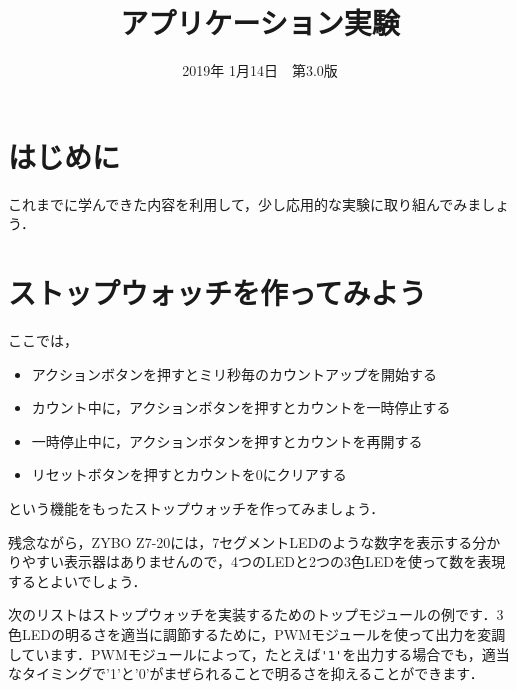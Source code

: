 \documentclass[a4paper,dvipdfmx]{jsarticle}
\begin{document}
\title{アプリケーション実験}
\author{}
\date{2019年 1月14日~~第3.0版}
\maketitle

\section{はじめに}
これまでに学んできた内容を利用して，少し応用的な実験に取り組んでみましょう．

\section{ストップウォッチを作ってみよう}
ここでは，
\begin{itemize}
 \item アクションボタンを押すとミリ秒毎のカウントアップを開始する
 \item カウント中に，アクションボタンを押すとカウントを一時停止する
 \item 一時停止中に，アクションボタンを押すとカウントを再開する
 \item リセットボタンを押すとカウントを0にクリアする
\end{itemize}
という機能をもったストップウォッチを作ってみましょう．

残念ながら，ZYBO Z7-20には，7セグメントLEDのような数字を表示する分かりやすい表示器はありませんので，4つのLEDと2つの3色LEDを使って数を表現するとよいでしょう．

次のリストはストップウォッチを実装するためのトップモジュールの例です．3色LEDの明るさを適当に調節するために，PWMモジュールを使って出力を変調しています．PWMモジュールによって，たとえば\verb|'1'|を出力する場合でも，適当なタイミングで'1'と'0'がまぜられることで明るさを抑えることができます．
\end{document}
